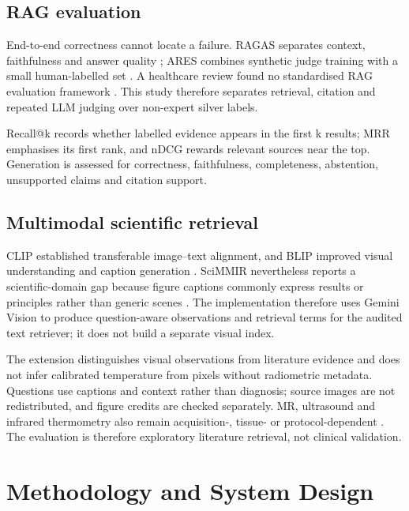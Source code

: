 \documentclass[11pt,a4paper]{article}
\begin{document}
\subsection{RAG evaluation}
\label{sec:rag-evaluation}

End-to-end correctness cannot locate a failure. RAGAS separates context, faithfulness and answer quality \cite{es2024ragas}; ARES combines synthetic judge training with a small human-labelled set \cite{saadfalcon2024ares}. A healthcare review found no standardised RAG evaluation framework \cite{amugongo2025healthcare}. This study therefore separates retrieval, citation and repeated LLM judging over non-expert silver labels.

Recall@k records whether labelled evidence appears in the first k results; MRR emphasises its first rank, and nDCG rewards relevant sources near the top. Generation is assessed for correctness, faithfulness, completeness, abstention, unsupported claims and citation support.

\subsection{Multimodal scientific retrieval}
\label{sec:multimodal-scientific-retrieval}

CLIP established transferable image--text alignment, and BLIP improved visual understanding and caption generation \cite{radford2021clip,li2022blip}. SciMMIR nevertheless reports a scientific-domain gap because figure captions commonly express results or principles rather than generic scenes \cite{wu2024scimmir}. The implementation therefore uses Gemini Vision to produce question-aware observations and retrieval terms for the audited text retriever; it does not build a separate visual index.

The extension distinguishes visual observations from literature evidence and does not infer calibrated temperature from pixels without radiometric metadata. Questions use captions and context rather than diagnosis; source images are not redistributed, and figure credits are checked separately. MR, ultrasound and infrared thermometry also remain acquisition-, tissue- or protocol-dependent \cite{mattay2024mr,lena2021interleaved,rohfritsch2024ultrasound,ring2012infrared,lahiri2012medical,stanley2024acute}. The evaluation is therefore exploratory literature retrieval, not clinical validation.

\FloatBarrier
\section{Methodology and System Design}
\label{sec:methodology-and-system-design}
\end{document}
